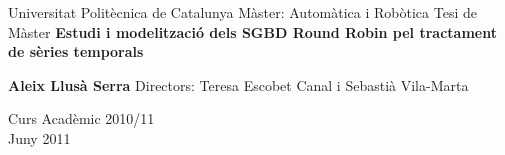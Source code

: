






%



\begin{titlepage}
\begin{center}
{\Large \sc Universitat Polit\`{e}cnica de Catalunya} \vskip 1cm
{M\`{a}ster:} \vskip 0.5cm {\sc Autom\`{a}tica i Rob\`{o}tica} \vskip 4cm {Tesi
de M\`{a}ster} \vskip 1cm {\Large \bf \sc  Estudi i modelització
    dels SGBD
    Round Robin pel tractament de sèries temporals}

\vskip 2cm {\bf Aleix Llusà Serra} \vskip 4cm { Directors:
   Teresa Escobet Canal i 
    Sebastià Vila-Marta}

\vskip 1cm {\large Curs Acad\`{e}mic 2010/11}\\
\vfill {Juny 2011}
\end{center}
\end{titlepage}

